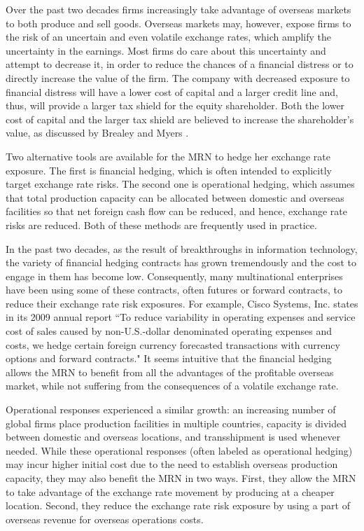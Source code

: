\documentclass[mnsc,nonblindrev,copyedit]{informs2_wz} %
\begin{document}
Over the past two decades firms increasingly take advantage of overseas markets to both produce and sell goods.  Overseas markets may, however, expose firms to the risk of an uncertain and even volatile exchange rates, which amplify the uncertainty in the earnings.  Most firms do care about this uncertainty and attempt to decrease it, in order to reduce the chances of a financial distress or to directly increase the value of the firm.  The company with decreased exposure to financial distress will have a lower cost of capital and a larger credit line and, thus, will provide a larger tax shield for the equity shareholder.  Both the lower cost of capital and the larger tax shield are believed to increase the shareholder's value, as discussed by Brealey and Myers \cite{Brealey2003}.

Two alternative tools are available for the MRN to hedge her exchange rate exposure.  The first is financial hedging, which is often intended to explicitly target exchange rate risks.  The second one is operational hedging, which assumes that total production capacity can be allocated between domestic and overseas facilities so that net foreign cash flow can be reduced, and hence, exchange rate risks are reduced.  Both of these methods are frequently used in practice.

In the past two decades, as the result of breakthroughs in information technology, the variety of financial hedging contracts has grown tremendously and the cost to engage in them has become low.  Consequently, many multinational enterprises have been using some of these contracts, often futures or forward contracts, to reduce their exchange rate risk exposures.  For example, Cisco Systems, Inc. states in its 2009 annual report \cite{cisco}  ``To reduce variability in operating expenses and service cost of sales caused by non-U.S.-dollar denominated operating expenses and costs, we hedge certain foreign currency forecasted transactions with currency options and forward contracts."  It seems intuitive that the financial hedging allows the MRN to benefit from all the advantages of the profitable overseas market, while not suffering from the consequences of a volatile exchange rate.  

Operational responses experienced a similar growth: an increasing number of global firms place production facilities in multiple countries, capacity is divided between domestic and overseas locations, and transshipment is used whenever needed.  While these operational responses (often labeled as operational hedging) may incur higher initial cost due to the need to establish overseas production capacity, they may also benefit the MRN in two ways.  First, they allow the MRN to take advantage of the exchange rate movement by producing at a cheaper location.  Second, they reduce the exchange rate risk exposure by using a part of overseas revenue for overseas operations costs.  
\end{document}
